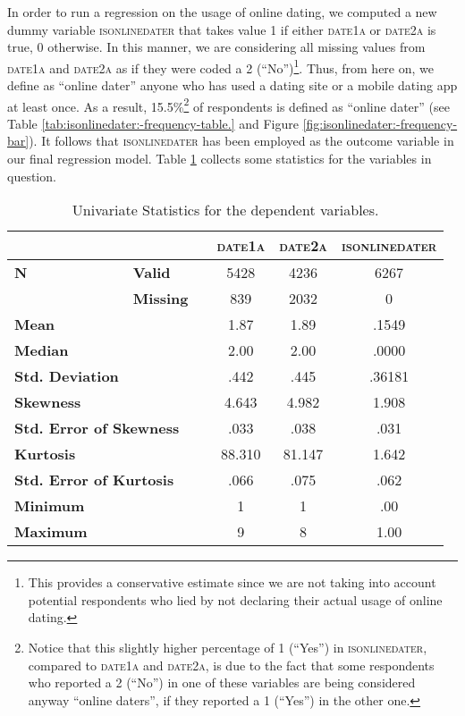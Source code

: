 In order to run a regression on the usage of online dating, we computed
a new dummy variable \textsc{isonlinedater} that takes value 1 if
either \textsc{date1a} or \textsc{date2a} is true, 0 otherwise. In
this manner, we are considering all missing values from \textsc{date1a}
and \textsc{date2a} as if they were coded a 2 (\textquotedblleft No\textquotedblright )\footnote{This provides a conservative estimate since we are not taking into
account potential respondents who lied by not declaring their actual
usage of online dating.}. Thus, from here on, we define as \textquotedblleft online dater\textquotedblright{}
anyone who has used a dating site or a mobile dating app at least
once. As a result, 15.5\%\footnote{Notice that this slightly higher percentage of 1 (\textquotedblleft Yes\textquotedblright )
in \textsc{isonlinedater}, compared to \textsc{date1a} and \textsc{date2a},
is due to the fact that some respondents who reported a 2 (\textquotedblleft No\textquotedblright )
in one of these variables are being considered anyway \textquotedblleft online
daters\textquotedblright , if they reported a 1 (\textquotedblleft Yes\textquotedblright )
in the other one. } of respondents is defined as \textquotedblleft online dater\textquotedblright{}
(see Table \ref{tab:isonlinedater:-frequency-table.} and Figure \ref{fig:isonlinedater:-frequency-bar}).
It follows that \textsc{isonlinedater} has been employed as the outcome
variable in our final regression model. Table \ref{tab:Univariate-Statistics-dependent}
collects some statistics for the variables in question.

\begin{table}[H]
\renewcommand{\arraystretch}{1.4}
\begin{centering}
\begin{tabular}{lllccc}
\hline 
 &  &  & \textsc{date1a} & \textsc{date2a} & \textsc{isonlinedater}\tabularnewline
\hline 
\hline 
\textbf{N} & \textbf{Valid} &  & 5428  & 4236 & 6267\tabularnewline
 & \textbf{Missing} &  & 839 & 2032 & 0\tabularnewline
\textbf{Mean} &  &  & 1.87 & 1.89 & .1549\tabularnewline
\textbf{Median} &  &  & 2.00 & 2.00 & .0000\tabularnewline
\textbf{Std. Deviation} &  &  & .442 & .445 & .36181\tabularnewline
\textbf{Skewness} &  &  & 4.643 & 4.982 & 1.908\tabularnewline
\multicolumn{2}{l}{\textbf{Std. Error of Skewness}} &  & .033 & .038 & .031\tabularnewline
\textbf{Kurtosis} &  &  & 88.310 & 81.147 & 1.642\tabularnewline
\multicolumn{2}{l}{\textbf{Std. Error of Kurtosis}} &  & .066 & .075 & .062\tabularnewline
\textbf{Minimum} &  &  & 1 & 1 & .00\tabularnewline
\textbf{Maximum} &  &  & 9 & 8 & 1.00\tabularnewline
\hline 
\end{tabular}\bigskip{}
\par\end{centering}
\begin{centering}
\caption{Univariate Statistics for the dependent variables.\label{tab:Univariate-Statistics-dependent} }
\par\end{centering}
\end{table}

